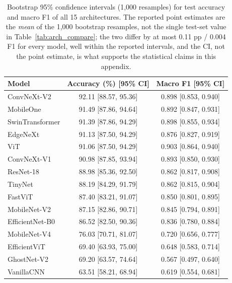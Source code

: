 \begin{table}[htbp]
\centering
\caption{Bootstrap 95\% confidence intervals (1,000 resamples) for test accuracy and macro F1 of all 15 architectures. The reported point estimates are the \emph{mean} of the 1,000 bootstrap resamples, not the single test-set value in Table~\ref{tab:arch_compare}; the two differ by at most 0.11 pp / 0.004 F1 for every model, well within the reported intervals, and the CI, not the point estimate, is what supports the statistical claims in this appendix.}
\label{tab:bootstrap_ci}
\small
\setlength{\tabcolsep}{4pt}
\begin{tabular}{lcc}
\toprule
\textbf{Model} & \textbf{Accuracy (\%) [95\% CI]} & \textbf{Macro F1 [95\% CI]} \\
\midrule
ConvNeXt-V2     & 92.11 [88.57, 95.36] & 0.898 [0.853, 0.940] \\
MobileOne       & 91.49 [87.86, 94.64] & 0.892 [0.847, 0.931] \\
SwinTransformer & 91.39 [87.86, 94.29] & 0.898 [0.855, 0.934] \\
EdgeNeXt        & 91.13 [87.50, 94.29] & 0.876 [0.827, 0.919] \\
ViT             & 91.06 [87.50, 94.29] & 0.903 [0.864, 0.940] \\
ConvNeXt-V1     & 90.98 [87.85, 93.94] & 0.893 [0.850, 0.930] \\
ResNet-18       & 88.98 [85.36, 92.50] & 0.862 [0.817, 0.908] \\
TinyNet         & 88.19 [84.29, 91.79] & 0.862 [0.815, 0.904] \\
FastViT         & 87.40 [83.21, 91.07] & 0.850 [0.801, 0.895] \\
MobileNet-V2    & 87.15 [82.86, 90.71] & 0.845 [0.794, 0.891] \\
EfficientNet-B0 & 86.52 [82.50, 90.36] & 0.836 [0.780, 0.884] \\
MobileNet-V4    & 76.03 [70.71, 81.07] & 0.720 [0.656, 0.777] \\
EfficientViT    & 69.40 [63.93, 75.00] & 0.648 [0.583, 0.714] \\
GhostNet-V2     & 69.20 [63.57, 74.64] & 0.567 [0.497, 0.640] \\
VanillaCNN      & 63.51 [58.21, 68.94] & 0.619 [0.554, 0.681] \\
\bottomrule
\end{tabular}
\end{table}

